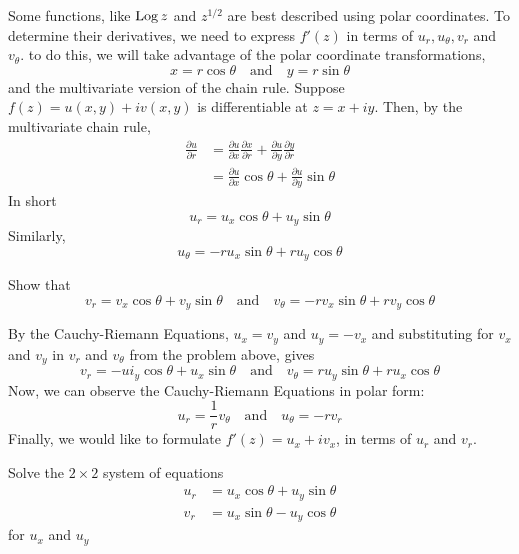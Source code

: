 \documentclass[handout]{ximera}
\begin{document}
Some functions, like $\operatorname{Log} z$ and $z^{1/2}$ are best described using polar coordinates. To determine their derivatives, we need 
to express $f'(z)$ in terms of $u_r, u_\theta, v_r$ and $v_\theta$. to do this, we will take advantage of the polar coordinate transformations,
\[
x = r\cos \theta \quad \mbox{and} \quad y=r\sin \theta
\]
and the multivariate version of the chain rule.
Suppose $f(z) = u(x,y) + iv(x,y)$ is differentiable at $z = x+iy$.
Then, by the multivariate chain rule,
\begin{align*}
\frac{\partial u}{\partial r} &= \frac{\partial u}{\partial x}\frac{\partial x}{\partial r}+\frac{\partial u}{\partial y}\frac{\partial y}{\partial r}\\
                              &= \frac{\partial u}{\partial x} \cos\theta + \frac{\partial u}{\partial y} \sin \theta
\end{align*}
In short
\[
u_r = u_x \cos \theta + u_y \sin\theta
\]
Similarly,
\[
u_\theta = -ru_x \sin \theta + ru_y \cos\theta
\]

\begin{problem}
Show that
\[
 v_r = v_x \cos \theta + v_y \sin\theta \quad \mbox{and} \quad  v_\theta = -rv_x \sin \theta + rv_y \cos\theta
\]
\end{problem}
By the Cauchy-Riemann Equations, $u_x = v_y$ and $u_y = -v_x$ and substituting for $v_x$ and $v_y$ in $v_r$ and $v_\theta$ from the problem above, gives
\[
v_r = -ui_y \cos \theta + u_x \sin\theta \quad \mbox{and} \quad  v_\theta = ru_y \sin \theta + ru_x \cos\theta
\]
Now, we can observe the Cauchy-Riemann Equations in polar form:
\[
u_r = \frac{1}{r} v_\theta \quad \mbox{and} \quad u_\theta = -rv_r
\]
Finally, we would like to formulate $f'(z) = u_x + iv_x$, in terms of $u_r$ and $v_r$.
\begin{problem} Solve the $2 \times 2$ system of equations
\begin{align*}
u_r &= u_x \cos \theta + u_y \sin\theta\\
v_r &= u_x \sin \theta -u_y \cos\theta
\end{align*}
for $u_x$ and $u_y$
\begin{multipleChoice}
\end{multipleChoice}
\end{problem}
\end{document}
